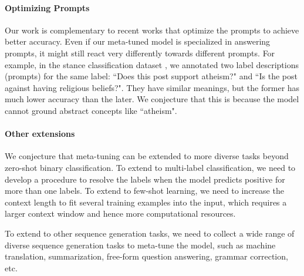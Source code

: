 \paragraph{Optimizing Prompts} Our work is complementary to recent works that optimize the prompts to achieve better accuracy. Even if our meta-tuned model is specialized in answering prompts, it might still react very differently towards different prompts. For example, in the stance classification dataset \cite{barbieri-etal-2020-tweeteval}, we annotated two label descriptions (prompts) for the same label: ``Does this post support atheism?" and ``Is the post against having religious beliefs?". They have similar meanings, but the former has much lower accuracy than the later. We conjecture that this is because the model cannot ground abstract concepts like ``atheism".

\paragraph{Other extensions} We conjecture that meta-tuning can be extended to more diverse tasks beyond zero-shot binary classification. To extend to multi-label classification, we need to develop a procedure to resolve the labels when the model predicts positive for more than one labels. To extend to few-shot learning, we need to increase the context length to fit several training examples into the input, which requires a larger context window and hence more computational resources.

To extend to other sequence generation tasks, we need to collect a wide range of diverse sequence generation tasks to meta-tune the model, such as machine translation, summarization, free-form question answering, grammar correction, etc.


